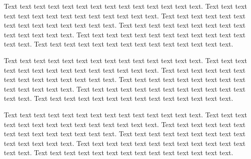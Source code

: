 \documentclass[letterpaper,11pt,oneside,pdftex]{article}
\begin{document}
Text text text text text text text text text text text text text text.
Text text text text text text text text text text text text text text.
Text text text text text text text text text text text text text text.
Text text text text text text text text text text text text text text.
Text text text text text text text text text text text text text text.
Text text text text text text text text text text text text text text.


Text text text text text text text text text text text text text text.
Text text text text text text text text text text text text text text.
Text text text text text text text text text text text text text text.
Text text text text text text text text text text text text text text.
Text text text text text text text text text text text text text text.
Text text text text text text text text text text text text text text.


Text text text text text text text text text text text text text text.
Text text text text text text text text text text text text text text.
Text text text text text text text text text text text text text text.
Text text text text text text text text text text text text text text.
Text text text text text text text text text text text text text text.
Text text text text text text text text text text text text text text.
\end{document}
